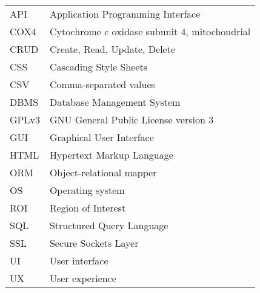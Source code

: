 \begin{longtable}{p{3cm}p{10cm}}
API & Application Programming Interface \\
COX4 & Cytochrome c oxidase subunit 4, mitochondrial \\
CRUD & Create, Read, Update, Delete \\
CSS & Cascading Style Sheets \\
CSV & Comma-separated values \\
DBMS & Database Management System \\
GPLv3 & GNU General Public License version 3 \\
GUI & Graphical User Interface \\
HTML & Hypertext Markup Language \\
ORM & Object-relational mapper \\
OS & Operating system \\
ROI & Region of Interest \\
SQL & Structured Query Language \\
SSL & Secure Sockets Layer \\
UI & User interface \\
UX & User experience
\end{longtable}
\addtocounter{table}{-1} 

